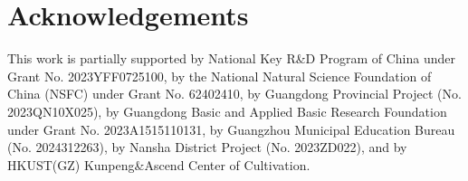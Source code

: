\documentclass[11pt]{article}
\theoremstyle{definition}
\begin{document}
\section*{Acknowledgements}
This work is partially supported by National Key R\&D Program of China under Grant No. 2023YFF0725100, by the National Natural Science Foundation of China (NSFC) under Grant No. 62402410, by Guangdong Provincial Project (No. 2023QN10X025), by Guangdong Basic and Applied Basic Research Foundation under Grant No. 2023A1515110131, by Guangzhou Municipal Education Bureau (No. 2024312263), by Nansha District Project (No. 2023ZD022), and by HKUST(GZ) Kunpeng\&Ascend Center of Cultivation.



\clearpage

\appendix


\end{document}
